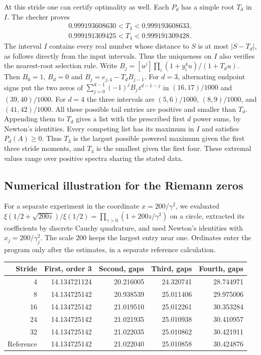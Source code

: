 \documentclass[11pt]{article}
\begin{document}
At this stride one can certify optimality as well. Each $P_d$ has a simple
root $T_d$ in $I$. The checker proves
\[
\begin{aligned}
0.999193608630<T_3<0.999193608633,\\
0.999191309425<T_4<0.999191309428.
\end{aligned}
\]
The interval $I$ contains every real number whose distance to $S$ is at
most $|S-T_d|$, as follows directly from the input intervals. Thus the
uniqueness on $I$ also verifies the nearest-root selection rule.
Write $B_j=[u^j]\prod_i(1+y_i^4u)/(1+T_du)$.
Then $B_0=1$, $B_d=0$ and $B_j=e_{j,4}-T_dB_{j-1}$.
For $d=3$, alternating endpoint signs put the two zeros of
$\sum_{j=0}^{d-1}(-1)^j B_j z^{d-1-j}$ in $(16,17)/1000$ and
$(39,40)/1000$. For $d=4$ the three intervals are $(5,6)/1000$,
$(8,9)/1000$, and $(41,42)/1000$. All these possible tail entries are
positive and smaller than $T_d$. Appending them to $T_d$ gives a list
with the prescribed first $d$ power sums, by Newton's identities.
Every competing list has its maximum in $I$ and satisfies $P_d(A)\ge0$.
Thus $T_3$ is the largest possible powered maximum given the first three
stride moments, and $T_4$ is the smallest given the first four. These
extremal values range over positive spectra sharing the stated data.

\subsection*{Numerical illustration for the Riemann zeros}
For a separate experiment in the coordinate $x=200/\gamma^2$, we evaluated
$\xi(1/2+\sqrt{200z})/\xi(1/2)=\prod_{\gamma>0}(1+200 z/\gamma^2)$
on a circle, extracted its coefficients by discrete Cauchy quadrature, and
used Newton's identities with $x_j=200/\gamma_j^2$. The scale $200$ keeps the
largest entry near one. Ordinates enter the program only after the estimates,
in a separate reference calculation.

\begin{center}
\begin{tabular}{r r r r r}\toprule
Stride & First, order 3 & Second, gaps & Third, gaps & Fourth, gaps\\\midrule
4  &14.134721124&20.216005&24.320741&28.744971\\
8  &14.134725142&20.938539&25.011406&29.975006\\
16 &14.134725142&21.019510&25.012261&30.353284\\
24 &14.134725142&21.021935&25.010938&30.410957\\
32 &14.134725142&21.022035&25.010862&30.421911\\\midrule
Reference&14.134725142&21.022040&25.010858&30.424876\\\bottomrule
\end{tabular}
\end{center}
\end{document}
